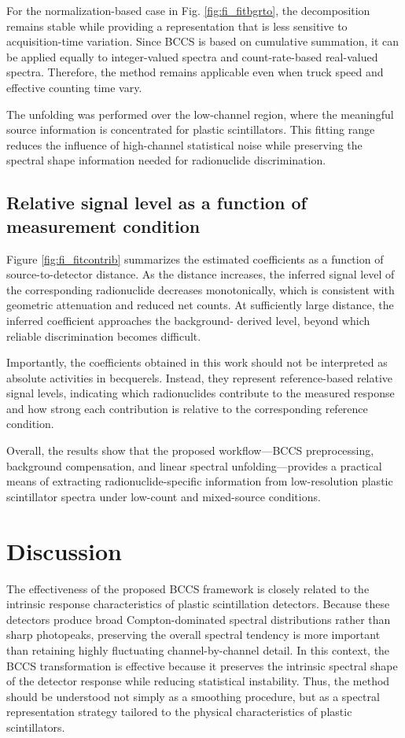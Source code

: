 \documentclass[10pt]{wlscirep}
\begin{document}
For the normalization-based case in Fig. \ref{fig:fi_fitbgrto}, the decomposition remains stable while providing a representation that is less sensitive to acquisition-time variation. Since BCCS is based on cumulative summation, it can be applied equally to integer-valued spectra and count-rate-based real-valued spectra. Therefore, the method remains applicable even when truck speed and effective counting time vary.

The unfolding was performed over the low-channel region, where the meaningful source information is concentrated for plastic scintillators. This fitting range reduces the influence of high-channel statistical noise while preserving the spectral shape information needed for radionuclide discrimination.


\subsection*{Relative signal level as a function of measurement condition}

Figure \ref{fig:fi_fitcontrib} summarizes the estimated coefficients as a function of source-to-detector distance. As the distance increases, the inferred signal level of the corresponding radionuclide decreases monotonically, which is consistent with geometric attenuation and reduced net counts. At sufficiently large distance, the inferred coefficient approaches the background- derived level, beyond which reliable discrimination becomes difficult.

Importantly, the coefficients obtained in this work should not be interpreted as absolute activities in becquerels. Instead, they represent reference-based relative signal levels, indicating which radionuclides contribute to the measured response and how strong each contribution is relative to the corresponding reference condition.

Overall, the results show that the proposed workflow—BCCS preprocessing, background compensation, and linear spectral unfolding—provides a practical means of extracting radionuclide-specific information from low-resolution plastic scintillator spectra under low-count and mixed-source conditions.

\section*{Discussion}

The effectiveness of the proposed BCCS framework is closely related to the intrinsic response characteristics of plastic scintillation detectors. Because these detectors produce broad Compton-dominated spectral distributions rather than sharp photopeaks, preserving the overall spectral tendency is more important than retaining highly fluctuating channel-by-channel detail. In this context, the BCCS transformation is effective because it preserves the intrinsic spectral shape of the detector response while reducing statistical instability. Thus, the method should be understood not simply as a smoothing procedure, but as a spectral representation strategy tailored to the physical characteristics of plastic scintillators.
\end{document}
